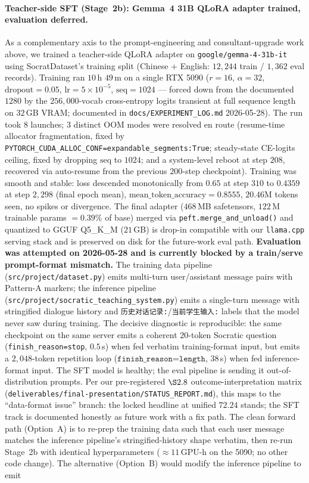 \documentclass[11pt]{article}
\begin{document}
\paragraph{Teacher-side SFT (Stage~2b): Gemma~4 31B QLoRA adapter trained, evaluation deferred.} As a complementary axis to the prompt-engineering and consultant-upgrade work above, we trained a teacher-side QLoRA adapter on \texttt{google/gemma-4-31b-it} using SocratDataset's training split (Chinese + English: $12{,}244$ train / $1{,}362$ eval records). Training ran $10$\,h $49$\,m on a single RTX 5090 ($r{=}16$, $\alpha{=}32$, $\text{dropout}{=}0.05$, $\text{lr}{=}5{\times}10^{-5}$, $\text{seq}{=}1024$ — forced down from the documented $1280$ by the $256{,}000$-vocab cross-entropy logits transient at full sequence length on $32$\,GB VRAM; documented in \texttt{docs/EXPERIMENT\_LOG.md} 2026-05-28). The run took $8$ launches; $3$ distinct OOM modes were resolved en route (resume-time allocator fragmentation, fixed by \texttt{PYTORCH\_CUDA\_ALLOC\_CONF=expandable\_segments:True}; steady-state CE-logits ceiling, fixed by dropping $\text{seq}$ to $1024$; and a system-level reboot at step $208$, recovered via auto-resume from the previous $200$-step checkpoint). Training was smooth and stable: loss descended monotonically from $0.65$ at step $310$ to $0.4359$ at step $2{,}298$ (final epoch mean), $\text{mean\_token\_accuracy}{=}0.8555$, $20.46$M tokens seen, no spikes or divergence. The final adapter ($468$\,MB safetensors, $122$\,M trainable params $={}0.39\%$ of base) merged via \texttt{peft.merge\_and\_unload()} and quantized to GGUF Q5\_K\_M ($21$\,GB) is drop-in compatible with our \texttt{llama.cpp} serving stack and is preserved on disk for the future-work eval path. \textbf{Evaluation was attempted on 2026-05-28 and is currently blocked by a train/serve prompt-format mismatch.} The training data pipeline (\texttt{src/project/dataset.py}) emits multi-turn user/assistant message pairs with Pattern-A markers; the inference pipeline (\texttt{src/project/socratic\_teaching\_system.py}) emits a single-turn message with stringified dialogue history and \texttt{历史对话记录:}/\texttt{当前学生输入:} labels that the model never saw during training. The decisive diagnostic is reproducible: the same checkpoint on the same server emits a coherent $20$-token Socratic question (\texttt{finish\_reason=stop}, $0.5$\,s) when fed verbatim training-format input, but emits a $2{,}048$-token repetition loop ($\texttt{finish\_reason=length}$, $38$\,s) when fed inference-format input. The SFT model is healthy; the eval pipeline is sending it out-of-distribution prompts. Per our pre-registered $\S 2.8$ outcome-interpretation matrix (\texttt{deliverables/final-presentation/STATUS\_REPORT.md}), this maps to the ``data-format issue'' branch: the locked headline at unified $72.24$ stands; the SFT track is documented honestly as future work with a fix path. The clean forward path (Option~A) is to re-prep the training data such that each user message matches the inference pipeline's stringified-history shape verbatim, then re-run Stage~2b with identical hyperparameters ($\approx 11$\,GPU-h on the 5090; no other code change). The alternative (Option~B) would modify the inference pipeline to emit 
\end{document}
